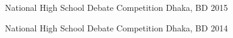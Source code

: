 
\begin{cvhonors}
  {National High School Debate Competition}
  {Dhaka, BD}
  {2015}
\end{cvhonors}

\begin{cvhonors}
  {National High School Debate Competition}
  {Dhaka, BD}
  {2014}
\end{cvhonors}